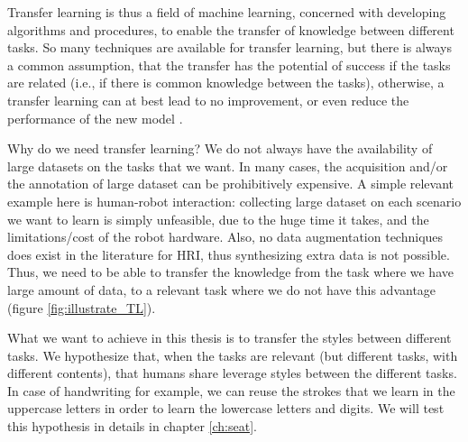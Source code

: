 \par Transfer learning is thus a field of machine learning, concerned with developing algorithms and procedures, to enable the transfer of knowledge between different tasks. So many techniques are available for transfer learning, but there is always a common assumption, that the transfer has the potential of success if the tasks are related (i.e., if there is common knowledge between the tasks), otherwise, a transfer learning can at best lead to no improvement, or even reduce the performance of the new model \citep{weiss2016survey}.

\par Why do we need transfer learning? We do not always have the availability of large datasets on the tasks that we want. In many cases, the acquisition and/or the annotation of large dataset can be prohibitively expensive. A simple relevant example here is human-robot interaction: collecting large dataset on each scenario we want to learn is simply unfeasible, due to the huge time it takes, and the limitations/cost of the robot hardware. Also, no data augmentation techniques does exist in the literature for HRI, thus synthesizing extra data is not possible. Thus, we need to be able to transfer the knowledge from the task where we have large amount of data, to a relevant task where we do not have this advantage (figure \ref{fig:illustrate_TL}).

\par What we want to achieve in this thesis is to transfer the styles between different tasks. We hypothesize that, when the tasks are relevant (but different tasks, with different contents), that humans share leverage styles between the different tasks. In case of handwriting for example, we can reuse the strokes that we learn in the uppercase letters in order to learn the lowercase letters and digits. We will test this hypothesis in details in chapter \ref{ch:seat}.

